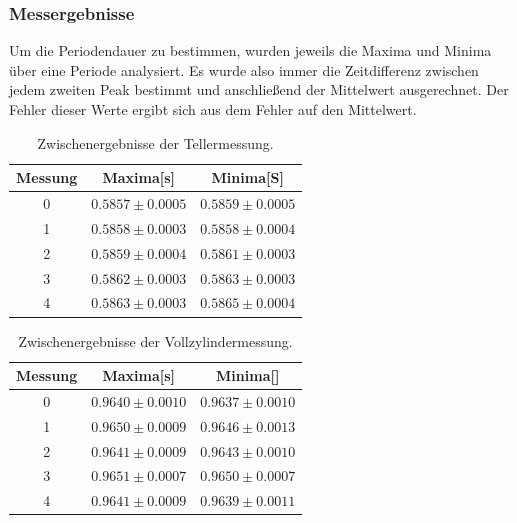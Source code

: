 \documentclass[12pt,a4paper]{article}
\begin{document}
\subsubsection{Messergebnisse}
Um die Periodendauer zu bestimmen, wurden jeweils die Maxima und Minima über eine Periode analysiert. Es wurde also immer die Zeitdifferenz zwischen jedem zweiten Peak bestimmt und anschließend der Mittelwert ausgerechnet. Der Fehler dieser Werte ergibt sich aus dem Fehler auf den Mittelwert.
\begin{table}
\caption{Zwischenergebnisse der Tellermessung.}
\begin{center}
\begin{tabular}{|c|c|c|}
\hline
Messung &  Maxima[s] &  Minima[S]  \\
\hline
0  & $ 0.5857 \pm  0.0005 $ & $ 0.5859 \pm  0.0005 $ \\
\hline
1  & $ 0.5858 \pm  0.0003 $ & $ 0.5858 \pm  0.0004 $ \\
\hline
2  & $ 0.5859 \pm  0.0004 $ & $ 0.5861 \pm  0.0003 $ \\
\hline
3  & $ 0.5862 \pm  0.0003 $ & $ 0.5863 \pm  0.0003 $ \\
\hline
4  & $ 0.5863 \pm  0.0003 $ & $ 0.5865 \pm  0.0004 $ \\
\hline
\end{tabular}
\end{center}
\label{tab:Teller_Ergebnisse}
\end{table}

\begin{table}
\caption{Zwischenergebnisse der Vollzylindermessung.}
\begin{center}
\begin{tabular}{|c|c|c|}
\hline
Messung &  Maxima[s] &  Minima[]  \\
\hline
0  & $ 0.9640 \pm  0.0010 $ & $ 0.9637 \pm  0.0010 $ \\
\hline
1  & $ 0.9650 \pm  0.0009 $ & $ 0.9646 \pm  0.0013 $ \\
\hline
2  & $ 0.9641 \pm  0.0009 $ & $ 0.9643 \pm  0.0010 $ \\
\hline
3  & $ 0.9651 \pm  0.0007 $ & $ 0.9650 \pm  0.0007 $ \\
\hline
4  & $ 0.9641 \pm  0.0009 $ & $ 0.9639 \pm  0.0011 $ \\
\hline
\end{tabular}
\end{center}
\label{tab:Voll_Ergebnisse}
\end{table}
\end{document}
